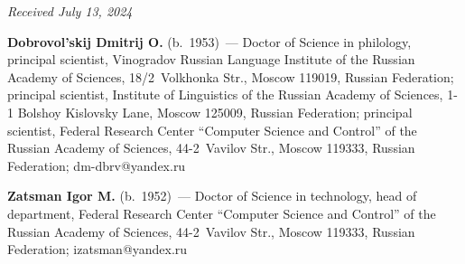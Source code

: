 \vspace*{-6pt}

\hfill{\small\textit{Received July 13, 2024}} 

\vspace*{-18pt}


\Contr

\vspace*{-3pt}

\noindent
\textbf{Dobrovol'skij Dmitrij O.} (b.\ 1953)~--- Doctor of Science in philology, principal 
scientist, Vinogradov Russian Language Institute of the Russian Academy of Sciences, 
18/2~Volkhonka Str., Moscow 119019, Russian Federation; principal scientist, Institute of 
Linguistics of the Russian Academy of Sciences, 1-1 Bolshoy Kislovsky Lane, Moscow 125009, 
Russian Federation; principal scientist, Federal Research Center ``Computer Science and Control'' of 
the Russian Academy of Sciences, 44-2~Vavilov Str., Moscow 119333, Russian Federation; 
\mbox{dm-dbrv@yandex.ru}

\vspace*{3pt}

\noindent
\textbf{Zatsman Igor M.} (b.\ 1952)~---  Doctor of Science in technology, head of department, 
Federal Research Center ``Computer Science and Control'' of the Russian Academy of Sciences,  
44-2~Vavilov Str., Moscow 119333, Russian Federation; \mbox{izatsman@yandex.ru}



\label{end\stat}

\renewcommand{\bibname}{\protect\rm Литература} 